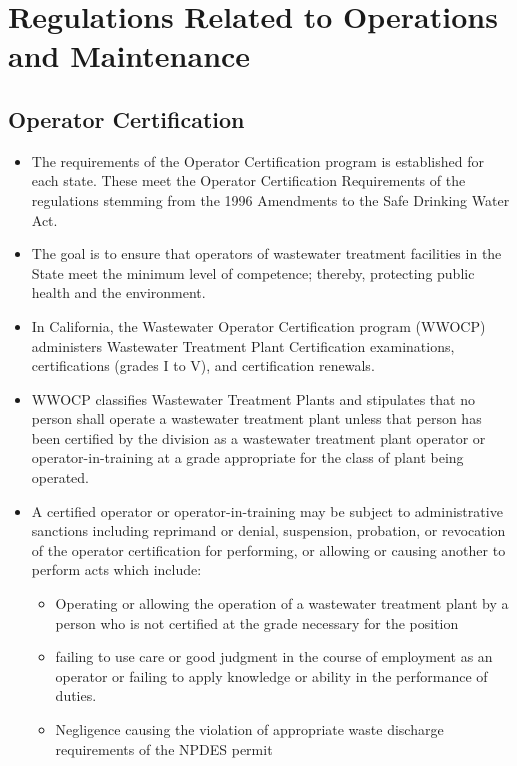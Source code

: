 \section{Regulations Related to Operations and Maintenance}
\subsection{Operator Certification}
\begin{itemize}
\item The requirements of the Operator Certification program is established for each state.  These meet the Operator Certification Requirements of the regulations stemming from the 1996 Amendments to the Safe Drinking Water Act.
\item The goal is to ensure that operators of wastewater treatment facilities in the State meet the minimum level of competence; thereby, protecting public health and the environment.
\item In California, the Wastewater Operator Certification program (WWOCP) administers Wastewater Treatment Plant Certification examinations, certifications (grades I to V), and certification renewals. 
\item WWOCP classifies Wastewater Treatment Plants and stipulates that no person shall operate a wastewater treatment plant unless that person has been certified by the division as a wastewater treatment plant operator or operator-in-training at a grade appropriate for the class of plant being operated.
\item A certified operator or operator-in-training may be subject to administrative sanctions including reprimand or denial, suspension, probation, or revocation of the operator certification for performing, or allowing or causing another to perform acts which include:
\begin{itemize}
\item Operating or allowing the operation of a wastewater treatment plant by a person who is not certified at the grade necessary for the position
\item failing to use care or good judgment in the course of employment as an operator or failing to apply knowledge or ability in the performance of duties.
\item Negligence causing the violation of appropriate waste discharge requirements of the NPDES permit
\end{itemize}
\end{itemize}



